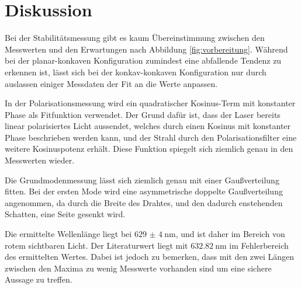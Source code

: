 \section{Diskussion}
\label{sec:Diskussion}

\raggedright

Bei der Stabilitätsmessung gibt es kaum Übereinstimmung zwischen den Messwerten und
den Erwartungen nach Abbildung \ref{fig:vorbereitung}. Während bei der planar-konkaven Konfiguration
zumindest eine abfallende Tendenz zu erkennen ist, lässt sich bei der konkav-konkaven Konfiguration
nur durch auslassen einiger Messdaten der Fit an die Werte anpassen.

In der Polarisationsmessung wird ein quadratischer Kosinus-Term mit konstanter Phase
als Fitfunktion verwendet. Der Grund dafür ist, dass der Laser bereits linear polarisiertes Licht
aussendet, welches durch einen Kosinus mit konstanter Phase beschrieben werden kann, und
der Strahl durch den Polarisationsfilter eine weitere Kosinuspotenz erhält.
Diese Funktion spiegelt sich ziemlich genau in den Messwerten wieder.

Die Grundmodenmessung lässt sich ziemlich genau mit einer Gaußverteilung fitten.
Bei der ersten Mode wird eine asymmetrische doppelte Gaußverteilung angenommen, da
durch die Breite des Drahtes, und den dadurch enstehenden Schatten, eine Seite gesenkt wird.

Die ermittelte Wellenlänge liegt bei $\SI{629(4)}{\nano\meter}$, und ist daher im
Bereich von rotem sichtbaren Licht. Der Literaturwert liegt mit $\SI{632.82}{\nano\meter}$ im
Fehlerbereich des ermittelten Wertes. Dabei ist jedoch zu bemerken, dass mit den zwei
Längen zwischen den Maxima zu wenig Messwerte vorhanden sind um eine sichere Aussage zu treffen.
